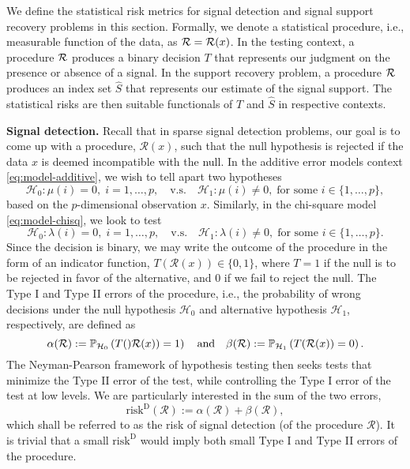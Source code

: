   
We define the statistical risk metrics for signal detection and signal support recovery problems in this section.
Formally, we denote a statistical procedure, i.e., measurable function of the data, as ${\cal R}={\cal R}(x)$.
In the testing context, a procedure ${\cal R}$ produces a binary decision $T$ that represents our judgment on the presence or absence of a signal. 
In the support recovery problem, a procedure ${\cal R}$ produces an index set $\widehat{S}$ that represents our estimate of the signal support.  
The statistical risks are then suitable functionals of ${T}$ and $\widehat{S}$ in respective contexts. 

{\bf Signal detection.} 
Recall that in sparse signal detection problems, our goal is to come up with a procedure, $\mathcal{R}(x)$, such that the null hypothesis is rejected if the data $x$ is deemed incompatible with the null.
In the additive error models context \eqref{eq:model-additive}, we wish to tell apart two hypotheses
\begin{equation} \label{eq:global-test-additive}
    \mathcal{H}_0: \mu(i) = 0, \;i=1,\ldots,p,
    \quad\text{v.s.}\quad 
    \mathcal{H}_1: \mu(i)\neq 0, \; \text{for some }i\in\{1,\ldots,p\},
\end{equation}
based on the $p$-dimensional observation $x$.
Similarly, in the chi-square model \eqref{eq:model-chisq}, we look to test
\begin{equation} \label{eq:global-test-chisq}
    \mathcal{H}_0: \lambda(i) = 0, \;i=1,\ldots,p,
    \quad\text{v.s.}\quad 
    \mathcal{H}_1: \lambda(i)\neq 0, \; \text{for some }i\in\{1,\ldots,p\}.
\end{equation} 
Since the decision is binary, we may write the outcome of the procedure in the form of an indicator function, 
$T(\mathcal{R}(x))\in\{0,1\}$, where $T=1$ if the null is to be rejected in favor of the alternative, and 0 if we fail to reject the null. 
The Type I and Type II errors of the procedure, i.e., the probability of wrong decisions under the null hypothesis $\mathcal{H}_0$ and alternative hypothesis $\mathcal{H}_1$, respectively, are defined as 
\begin{equation} \label{eq:type-II-error}
    \alpha(\mathcal{R}) := \P_{\mathcal{H}_0}\left(T()\mathcal{R}(x))=1\right)
    \quad \text{and} \quad
    \beta(\mathcal{R}) := \P_{\mathcal{H}_1}\left(T(\mathcal{R}(x))=0\right).
\end{equation}
The Neyman-Pearson framework of hypothesis testing then seeks tests that minimize the Type II error of the test, while controlling the Type I error of the test at low levels.
We are particularly interested in the sum of the two errors, 
\begin{equation} \label{eq:risk-detection}
    \mathrm{risk}^{\mathrm{D}}(\mathcal{R}) := \alpha(\mathcal{R}) + \beta(\mathcal{R}),
\end{equation}
which shall be referred to as the risk of signal detection (of the procedure $\mathcal{R}$).
It is trivial that a small $\mathrm{risk}^{\mathrm{D}}$ would imply both small Type I and Type II errors of the procedure.

